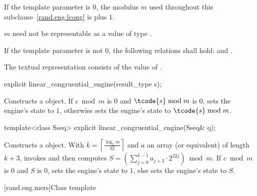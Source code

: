 \pnum
If the template parameter
 is $0$,
the modulus $m$
used throughout this subclause~\ref{rand.eng.lcong}
is  plus $1$.
\begin{note}
 $m$ need not be representable
 as a value of type .
\end{note}

\pnum
If the template parameter
 is not $0$,
the following relations shall hold:
and
  .

\pnum The textual representation%
consists of
the value of .

%
\begin{itemdecl}
explicit linear_congruential_engine(result_type s);
\end{itemdecl}

\begin{itemdescr}
\pnum\effects Constructs a  object.
 If $c \bmod m$ is $0$ and $\tcode{s} \bmod m$ is $0$,
 sets the engine's state to $1$,
 otherwise sets the engine's state to $\tcode{s} \bmod m$.
\end{itemdescr}

%
\begin{itemdecl}
template<class Sseq> explicit linear_congruential_engine(Sseq& q);
\end{itemdecl}

\begin{itemdescr}
\pnum\effects Constructs a  object.
 With
 $k = \left\lceil \frac{\log_2 m}{32} \right\rceil$
 and $a$ an array (or equivalent)
 of length $k + 3$,
 invokes 
 and then computes
 $S = \left(\sum_{j = 0}^{k - 1} a_{j + 3} \cdot 2^{32j} \right) \bmod m$.
 If $c \bmod m$ is $0$ and $S$ is $0$,
 sets the engine's state to $1$,
 else sets the engine's state
 to $S$.
\end{itemdescr}


[rand.eng.mers]{Class template }%
%

